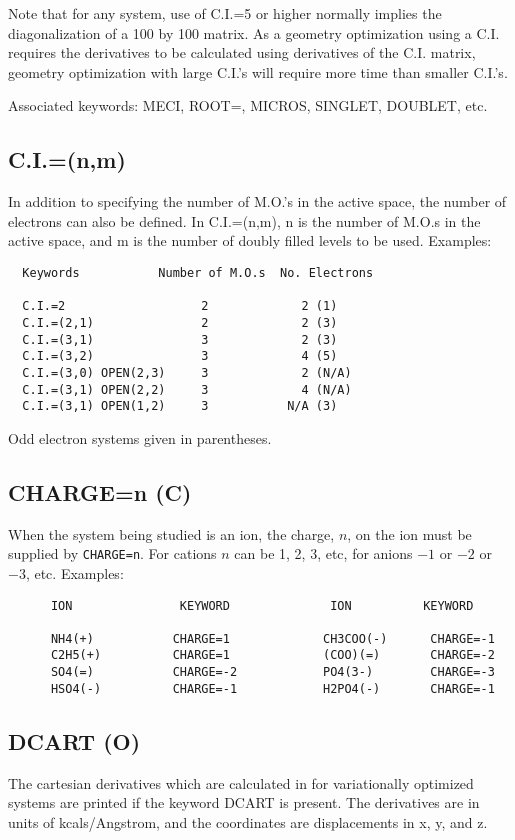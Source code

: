     Note that for any system, use of C.I.=5 or higher  normally  implies
the  diagonalization  of a 100 by 100 matrix.  As a geometry optimization
using a C.I. requires the derivatives to be calculated using  derivatives
of  the C.I. matrix, geometry optimization with large C.I.'s will require
more time than smaller C.I.'s.

Associated keywords:  MECI, ROOT=, MICROS, SINGLET, DOUBLET, etc.
                                          
\subsection*{C.I.=(n,m)}
    In addition to specifying the number of M.O.'s in the active  space,
the  number  of  electrons  can also be defined.  In C.I.=(n,m), n is the
number of M.O.s in the active space, and m is the number of doubly filled
levels to be used.
Examples:
\begin{verbatim}
  Keywords           Number of M.O.s  No. Electrons

  C.I.=2                   2             2 (1)
  C.I.=(2,1)               2             2 (3)
  C.I.=(3,1)               3             2 (3)
  C.I.=(3,2)               3             4 (5)
  C.I.=(3,0) OPEN(2,3)     3             2 (N/A)
  C.I.=(3,1) OPEN(2,2)     3             4 (N/A)
  C.I.=(3,1) OPEN(1,2)     3           N/A (3)
\end{verbatim}
Odd electron systems given in parentheses.

\subsection*{CHARGE=n (C)}
 When the system being studied is an ion, the charge, $n$, on  the  ion
 must be supplied by \verb/CHARGE=n/.  For cations $n$ can be 1, 2, 3, etc, 
 for anions $-1$ or $-2$ or $-3$, etc.
 Examples:
\begin{verbatim}
      ION               KEYWORD              ION          KEYWORD

      NH4(+)           CHARGE=1             CH3COO(-)      CHARGE=-1
      C2H5(+)          CHARGE=1             (COO)(=)       CHARGE=-2
      SO4(=)           CHARGE=-2            PO4(3-)        CHARGE=-3
      HSO4(-)          CHARGE=-1            H2PO4(-)       CHARGE=-1
\end{verbatim}

\subsection*{DCART (O)}
 The  cartesian  derivatives  which  are  calculated  in    for
 variationally  optimized  systems  are  printed  if  the keyword DCART is
 present.  The  derivatives  are  in  units  of  kcals/Angstrom,  and  the
 coordinates are displacements in x, y, and z.



